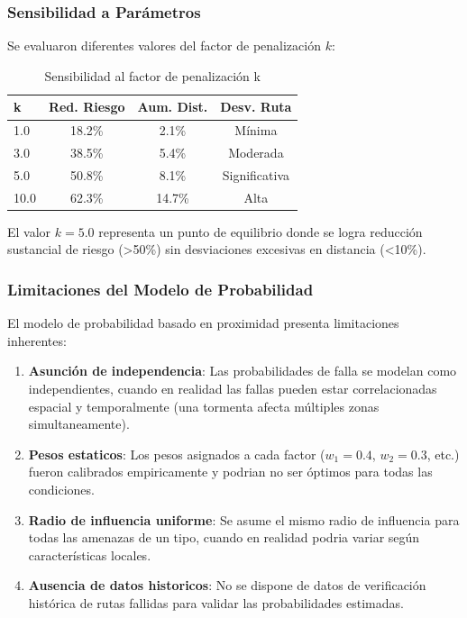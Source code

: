 \documentclass[conference]{IEEEtran}
\begin{document}
\subsubsection{Sensibilidad a Parámetros}

Se evaluaron diferentes valores del factor de penalización $k$:

\begin{table}[!t]
\centering
\caption{Sensibilidad al factor de penalización k}
\begin{tabular}{@{}lccc@{}}
\toprule
\textbf{k} & \textbf{Red. Riesgo} & \textbf{Aum. Dist.} & \textbf{Desv. Ruta} \\
\midrule
1.0 & 18.2\% & 2.1\% & Mínima \\
3.0 & 38.5\% & 5.4\% & Moderada \\
5.0 & 50.8\% & 8.1\% & Significativa \\
10.0 & 62.3\% & 14.7\% & Alta \\
\bottomrule
\end{tabular}
\end{table}

El valor $k = 5.0$ representa un punto de equilibrio donde se logra reducción sustancial de riesgo (>50\%) sin desviaciones excesivas en distancia (<10\%).

\subsubsection{Limitaciones del Modelo de Probabilidad}

El modelo de probabilidad basado en proximidad presenta limitaciones inherentes:

\begin{enumerate}
    \item \textbf{Asunción de independencia}: Las probabilidades de falla se modelan como independientes, cuando en realidad las fallas pueden estar correlacionadas espacial y temporalmente (una tormenta afecta múltiples zonas simultaneamente).

    \item \textbf{Pesos estaticos}: Los pesos asignados a cada factor ($w_1=0.4$, $w_2=0.3$, etc.) fueron calibrados empiricamente y podrian no ser óptimos para todas las condiciones.

    \item \textbf{Radio de influencia uniforme}: Se asume el mismo radio de influencia para todas las amenazas de un tipo, cuando en realidad podria variar según características locales.

    \item \textbf{Ausencia de datos historicos}: No se dispone de datos de verificación histórica de rutas fallidas para validar las probabilidades estimadas.
\end{enumerate}
\end{document}

